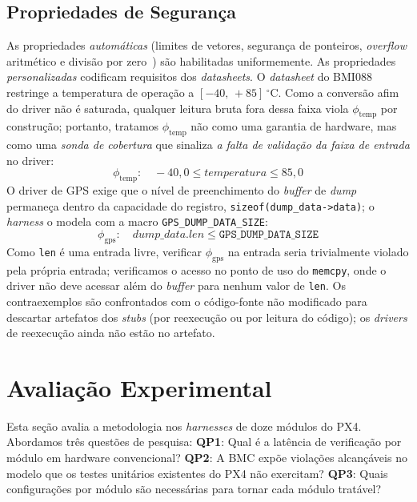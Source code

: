 \documentclass[conference]{IEEEtran}
\begin{document}
\subsection{Propriedades de Segurança}
\label{subsec:properties}

As propriedades \emph{automáticas} (limites de vetores, segurança de
ponteiros, \textit{overflow} aritmético e divisão por
zero~\cite{Menezes2024,Monteiro2022}) são habilitadas uniformemente.
As propriedades \emph{personalizadas} codificam requisitos dos
\textit{datasheets}.
O \textit{datasheet} do BMI088~\cite{Bosch2022} restringe a
temperatura de operação a $[-40,\,+85]\,^\circ$C. Como a conversão
afim do driver não é saturada, qualquer leitura bruta fora dessa
faixa viola $\phi_{\text{temp}}$ por construção; portanto, tratamos
$\phi_{\text{temp}}$ não como uma garantia de hardware, mas como uma
\emph{sonda de cobertura} que sinaliza \emph{a falta de validação da
faixa de entrada} no driver:
\begin{equation}
  \phi_{\text{temp}}: \quad -40{,}0 \leq \textit{temperatura} \leq 85{,}0
  \label{eq:prop_temp}
\end{equation}
O driver de GPS exige que o nível de preenchimento do \textit{buffer}
de \textit{dump} permaneça dentro da capacidade do registro,
\texttt{sizeof(dump\_data->data)}; o \textit{harness} o modela com a
macro \texttt{GPS\_DUMP\_DATA\_SIZE}:
\begin{equation}
  \phi_{\text{gps}}: \quad \textit{dump\_data.len} \leq \texttt{GPS\_DUMP\_DATA\_SIZE}
  \label{eq:prop_gps}
\end{equation}
Como \texttt{len} é uma entrada livre, verificar $\phi_{\text{gps}}$
na entrada seria trivialmente violado pela própria entrada;
verificamos o acesso no ponto de uso do \texttt{memcpy}, onde o
driver não deve acessar além do \textit{buffer} para nenhum valor de
\texttt{len}.
Os contraexemplos são confrontados com o código-fonte não modificado
para descartar artefatos dos \textit{stubs} (por reexecução ou por
leitura do código); os \textit{drivers} de reexecução ainda não estão
no artefato.

\section{Avaliação Experimental}
\label{sec:results}

Esta seção avalia a metodologia nos \textit{harnesses} de doze
módulos do PX4. Abordamos três questões de pesquisa:
\textbf{QP1}: Qual é a latência de verificação por módulo em hardware
convencional? \textbf{QP2}: A BMC expõe violações alcançáveis no
modelo que os testes unitários existentes do PX4 não exercitam?
\textbf{QP3}: Quais configurações por módulo são necessárias para
tornar cada módulo tratável?
\end{document}
